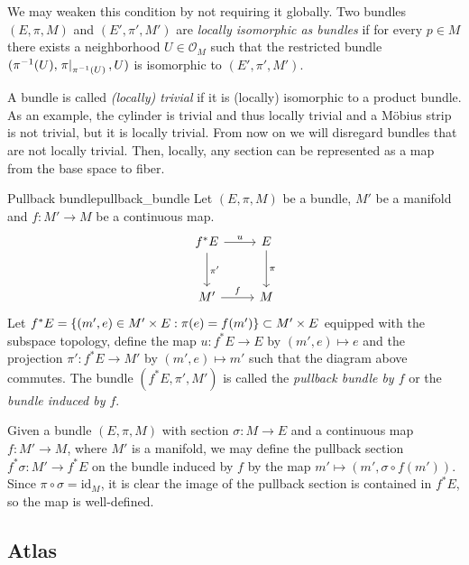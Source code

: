 We may weaken this condition by not requiring it globally. Two bundles \((E, \pi, M)\) and \((E', \pi', M')\) are \emph{locally isomorphic as bundles} if for every \(p \in M\) there exists a neighborhood \(U \in \mathcal{O}_M\) such that the restricted bundle \((\pi^{-1}(U), \left.\pi\right\rvert_{\pi^{-1}(U)}, U)\) is isomorphic to \((E', \pi', M')\).

A bundle is called \emph{(locally) trivial} if it is (locally) isomorphic to a product bundle. As an example, the cylinder is trivial and thus locally trivial and a Möbius strip is not trivial, but it is locally trivial. From now on we will disregard bundles that are not locally trivial. Then, locally, any section can be represented as a map from the base space to fiber.

\begin{definition}{Pullback bundle}{pullback_bundle}
    Let \((E, \pi, M)\) be a bundle, \(M'\) be a manifold and \(f : M' \to M\) be a continuous map.
    \begin{equation*}
        \begin{tikzcd}[column sep = normal, row sep = large]
            f^\ast E \arrow{d}{\pi'} \arrow{r}{u} & E \arrow{d}{\pi} \\
            M' \arrow{r}{f} & M
        \end{tikzcd}
    \end{equation*}
    Let \(f^\ast E = \{(m', e) \in M'\times E : \pi(e) = f(m')\} \subset M' \times E\) equipped with the subspace topology, define the map \(u : f^\ast E \to E\) by \( (m', e) \mapsto e\) and the projection \(\pi' : f^\ast E \to M'\) by \((m',e)\mapsto m'\) such that the diagram above commutes. The bundle \((f^\ast E, \pi', M')\) is called the \emph{pullback bundle by \(f\)} or the \emph{bundle induced by \(f\)}.
\end{definition}

Given a bundle \((E, \pi, M)\) with section \(\sigma : M \to E\) and a continuous map \(f : M' \to M\), where \(M'\) is a manifold, we may define the pullback section \(f^\ast \sigma : M' \to f^\ast E\) on the bundle induced by \(f\) by the map \( m' \mapsto (m', \sigma\circ f(m'))\). Since \(\pi \circ \sigma = \mathrm{id}_M\), it is clear the image of the pullback section is contained in \(f^\ast E\), so the map is well-defined.

\subsection{Atlas}

